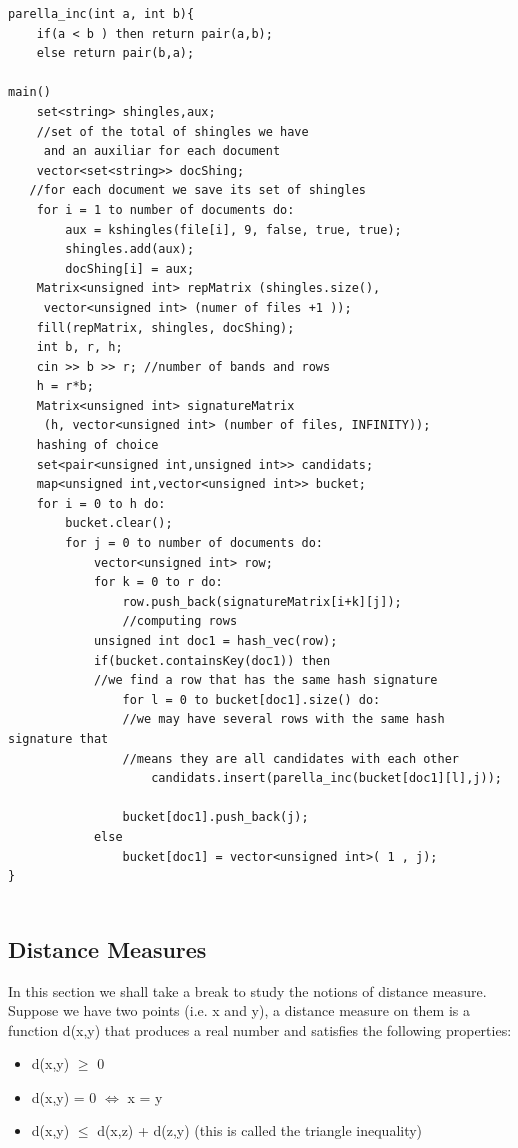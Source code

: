 \documentclass[12pt]{article}
\begin{document}
\begin{lstlisting}
parella_inc(int a, int b){
	if(a < b ) then return pair(a,b);
	else return pair(b,a);

main()
    set<string> shingles,aux;	
    //set of the total of shingles we have
     and an auxiliar for each document
    vector<set<string>> docShing; 
   //for each document we save its set of shingles
    for i = 1 to number of documents do:
        aux = kshingles(file[i], 9, false, true, true);
        shingles.add(aux);
        docShing[i] = aux;
    Matrix<unsigned int> repMatrix (shingles.size(),
     vector<unsigned int> (numer of files +1 ));
    fill(repMatrix, shingles, docShing);
    int b, r, h;
    cin >> b >> r; //number of bands and rows
    h = r*b;
    Matrix<unsigned int> signatureMatrix
     (h, vector<unsigned int> (number of files, INFINITY));
    hashing of choice
    set<pair<unsigned int,unsigned int>> candidats;                     
    map<unsigned int,vector<unsigned int>> bucket;
    for i = 0 to h do:
        bucket.clear();
        for j = 0 to number of documents do:
            vector<unsigned int> row;
            for k = 0 to r do:
                row.push_back(signatureMatrix[i+k][j]);
                //computing rows
            unsigned int doc1 = hash_vec(row);
			if(bucket.containsKey(doc1)) then
			//we find a row that has the same hash signature
				for l = 0 to bucket[doc1].size() do: 
				//we may have several rows with the same hash signature that 
				//means they are all candidates with each other
					candidats.insert(parella_inc(bucket[doc1][l],j));
				           
            	bucket[doc1].push_back(j);
            else 
            	bucket[doc1] = vector<unsigned int>( 1 , j);
}
 
 \end{lstlisting}
 
\subsection{Distance Measures}

In this section we shall take a break to study the notions of distance measure.
Suppose we have two points (i.e. x and y), a distance measure on them is a function d(x,y) that produces a real number and satisfies the following properties:
\begin{itemize}
\item d(x,y) $\geq$ 0 

\item d(x,y) = 0 $\iff$ x = y 

\item d(x,y) $\leq$ d(x,z) + d(z,y) (this is called the triangle inequality)
\end{itemize}
\end{document}

